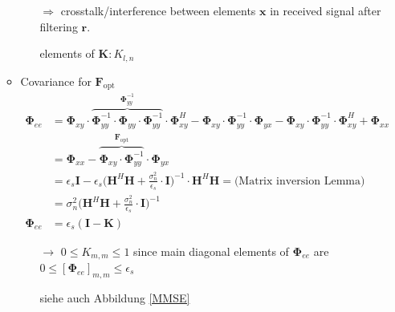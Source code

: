 \documentclass[a4paper, 10pt]{article}
\begin{document}
\begin{itemize}
\begin{itemize}
		\begin{itemize}
			\item[$\Rightarrow$] crosstalk/interference between elements $\mathbf{x}$ in received signal after filtering $\mathbf{r}$.
			\item[] elements of $\mathbf{K}: K_{l,n}$		
		\end{itemize}
		\item Covariance for $\mathbf{F}_{\text{opt}}$				
		\begin{align*}
			\boldsymbol{\Phi}_{ee}  &= \boldsymbol{\Phi}_{xy}\cdot\overbrace{\boldsymbol{\Phi}_{yy}^{-1} \cdot\boldsymbol{\Phi}_{yy}\cdot\boldsymbol{\Phi}_{yy}^{-1}}^{\boldsymbol{\Phi}_{yy}^{-1}}\cdot \boldsymbol{\Phi}_{xy}^H - \boldsymbol{\Phi}_{xy}\cdot\boldsymbol{\Phi}_{yy}^{-1}\cdot\boldsymbol{\Phi}_{yx} - \boldsymbol{\Phi}_{xy}\cdot\boldsymbol{\Phi}_{yy}^{-1}\cdot\boldsymbol{\Phi}_{xy}^H + \boldsymbol{\Phi}_{xx} \\ &= \boldsymbol{\Phi}_{xx} - \overbrace{\boldsymbol{\Phi}_{xy}\cdot\boldsymbol{\Phi}_{yy}^{-1}}^{\mathbf{F}_{\text{opt}}}\cdot\boldsymbol{\Phi}_{yx}\\ &= \epsilon_s\mathbf{I} - \epsilon_s\bigl(\mathbf{H}^H\mathbf{H} + \frac{\sigma_n^2}{\epsilon_s}\cdot\mathbf{I}\bigr)^{-1}\cdot\mathbf{H}^H\mathbf{H}	 = \text{(Matrix inversion Lemma)}\\ &= \sigma_n^2 \bigl(\mathbf{H}^H\mathbf{H} + \frac{\sigma_n^2}{\epsilon_s}\cdot\mathbf{I}\bigr)^{-1}\\
			\boldsymbol{\Phi}_{ee} &= \epsilon_s(\mathbf{I} - \mathbf{K})	
		\end{align*}
  		\begin{itemize}
  			\item[$\rightarrow$] $ 0 \leq K_{m,m} \leq 1 $ since main diagonal elements of $ \boldsymbol{\Phi}_{ee} $ are $ 0 \leq [\boldsymbol{\Phi}_{ee}]_{m,m} \leq \epsilon_s $
  			\item[] siehe auch Abbildung \ref{MMSE}
  		\end{itemize}	
	\end{itemize}
\end{itemize}
\end{document}
